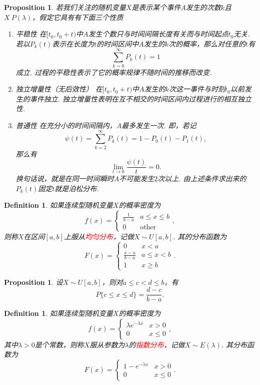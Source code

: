 \documentclass{article}
\newtheorem{proposition}[theorem]{Proposition}
\newtheorem{definition}[theorem]{Definition}
\newcommand{\redt}[1]{\textcolor{red}{#1}}
\begin{document}
\begin{proposition}
\rm 若我们关注的随机变量$X$是表示某个事件$A$发生的次数$k$且$X~P(\lambda)$，假定它具有有下面三个性质
\begin{enumerate}
	\item {\color{red}平稳性} 在$[t_0,t_0+t)$中$A$发生个数只与时间间隔长度有关而与时间起点$t_0$无关. 若以$P_k(t)$表示在长度为$t$的时间区间中$A$发生的$k$次的概率，那么对任意的$t$有
	$$
	\sum\limits_{k=0}^{\infty} P_k(t) = 1
	$$
	成立. 过程的平稳性表示了它的概率规律不随时间的推移而改变.
	\item {\color{red}独立增量性（无后效性）} 在$[t_0,t_0+t)$中$A$发生的$k$次这一事件与时刻$t_0$以前发生的事件独立. 独立增量性表明在互不相交的时间区间内过程进行的相互独立性.
	\item {\color{red}普通性} 在充分小的时间间隔内，$A$最多发生一次. 即，若记
	$$
	\psi(t) = \sum\limits_{k=2}^{\infty} P_k(t) = 1-P_0(t)-P_1(t),
	$$
	那么有
	$$
	\lim\limits_{t \rightarrow 0} \frac{\psi(t)}{t} = 0.
	$$
	换句话说，就是在同一时间瞬时$A$不可能发生$2$次以上. 由上述条件求出来的$P_k(t)$固定$t$就是泊松分布. 
\end{enumerate}
\end{proposition}

\begin{definition}
\rm 如果连续型随机变量$X$的概率密度为
$$
f(x) = \left\{\begin{array}{ll}
\frac{1}{b-a} & a \leq x \leq b\\
0 & \text{other}
\end{array}\right.,
$$
则称$X$在区间$[a,b]$上服从\redt{均匀分布}，记做$X \sim U[a,b]$. 其的分布函数为
$$
F(x) = \left\{\begin{array}{ll}
0 & x < a \\
\frac{x-a}{b-a} & a \leq x < b\\
1 & x \geq b
\end{array}\right..
$$
\end{definition}

\begin{proposition}
\rm 设$X \sim U[a,b]$，则对$a \leq c < d \leq b$，有
$$
P\{c\leq x \leq d\} = \frac{d-c}{b-a}.
$$
\end{proposition}

\begin{definition}
\rm 如果连续型随机变量$X$的概率密度为
$$
f(x) = \left\{ \begin{array}{ll}
\lambda e^{-\lambda x} & x > 0 \\
0 & x \leq 0
\end{array}\right.,
$$
其中$\lambda > 0$是个常数，则称$X$服从参数为$\lambda$的\redt{指数分布}，记做$X \sim E(\lambda)$. 其分布函数为
$$
F(x) = \left\{\begin{array}{ll}
1 - e^{-\lambda x} & x > 0 \\
0 & x \leq 0
\end{array}\right..
$$
\end{definition}
\end{document}
